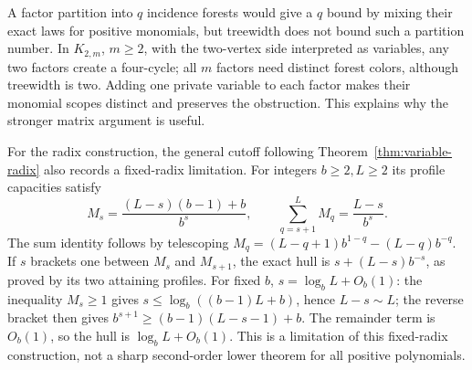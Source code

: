 A factor partition into $q$ incidence forests would give a $q$ bound
by mixing their exact laws for positive monomials, but treewidth does
not bound such a partition number. In $K_{2,m}$, $m\ge2$, with the two-vertex
side interpreted as variables, any two factors create a four-cycle;
all $m$ factors need distinct forest colors, although treewidth is two.
Adding one private variable to each factor makes their monomial scopes
distinct and preserves the obstruction. This explains why the stronger
matrix argument is useful.

For the radix construction, the general cutoff following
Theorem~\ref{thm:variable-radix} also records a fixed-radix limitation.
For integers $b\ge2,L\ge2$ its profile capacities satisfy
\[
 M_s=\frac{(L-s)(b-1)+b}{b^s},\qquad
 \sum_{q=s+1}^L M_q=\frac{L-s}{b^s}.
\]
The sum identity follows by telescoping
$M_q=(L-q+1)b^{1-q}-(L-q)b^{-q}$.
If $s$ brackets one between $M_s$ and $M_{s+1}$, the exact hull is
$s+(L-s)b^{-s}$, as proved by its two attaining profiles.
For fixed $b$, $s=\log_b L+O_b(1)$: the inequality $M_s\ge1$ gives
$s\le\log_b((b-1)L+b)$, hence $L-s\sim L$; the reverse bracket then
gives $b^{s+1}\ge(b-1)(L-s-1)+b$. The remainder term is $O_b(1)$,
so the hull is $\log_b L+O_b(1)$. This is a limitation of this
fixed-radix construction, not a sharp second-order lower theorem for
all positive polynomials.
